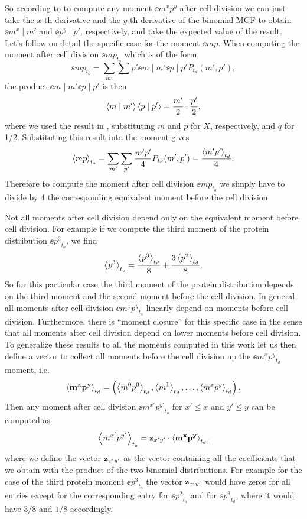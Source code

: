 So according to  to compute any moment $\ee{m^x
p^y}$ after cell division we can just take the $x$-th derivative and the $y$-th
derivative of the binomial MGF to obtain $\ee{m^x \mid m'}$ and $\ee{p^y \mid
p'}$, respectively, and take the expected value of the result. Let's follow on
detail the specific case for the moment $\ee{m p}$. When computing the moment
after cell division $\ee{mp}_{t_o}$ which is of
the form
\begin{equation}
\ee{mp}_{t_o} = \sum_{m'} \sum{p'} \ee{m \mid m'} \ee{p \mid p'} 
                P_{t_d}(m', p'),
\end{equation}
the product $\ee{m \mid m'} \ee{p \mid p'}$ is then
\begin{equation}
\left\langle m \mid m' \right\rangle \left\langle p \mid p' \right\rangle = {m' \over 2} \cdot {p' \over 2},
\end{equation}
where we used the result in , substituting $m$ and $p$ for
$X$, respectively, and $q$ for 1/2. Substituting this result into the moment
gives
\begin{equation}
\left\langle mp \right\rangle_{t_o} = \sum_{m'} \sum_{p'} {m' p' \over 4} P_{t_d}(m', p') 
              = {\left\langle m' p' \right\rangle_{t_d} \over 4}.
\end{equation}
Therefore to compute the moment after cell division $\ee{mp}_{t_o}$ we simply
have to divide by 4 the corresponding equivalent moment before the cell
division. 

Not all moments after cell division depend only on the equivalent moment before
cell division. For example if we compute the third moment of the protein
distribution $\ee{p^3}_{t_o}$, we find
\begin{equation}
  \left\langle p^3 \right\rangle_{t_o} = {\left\langle p^3 \right\rangle_{t_d} \over 8} + {3 \left\langle p^2 \right\rangle_{t_d} \over 8}.
\end{equation}
So for this particular case the third moment of the protein distribution
depends on the third moment and the second moment before the cell division. In
general all moments after cell division $\ee{m^x p^y}_{t_o}$ linearly depend on
moments before cell division. Furthermore, there is ``moment closure'' for this
specific case in the sense that all moments after cell division depend on lower
moments before cell division. To generalize these results to all the moments
computed in this work let us then define a vector to collect all moments before
the cell division up the $\ee{m^x p^y}_{t_d}$ moment, i.e.
\begin{equation}
\mathbf{\left\langle m^x p^y \right\rangle}_{t_d} = \left(
\left\langle m^0 p^0 \right\rangle_{t_d}, \left\langle m^1 \right\rangle_{t_d}, \ldots , \left\langle m^x p^y \right\rangle_{t_d}
\right).
\end{equation}
Then any moment after cell division $\ee{m^{x'} p^{y'}}_{t_o}$ for $x' \leq x$ and $y' \leq y$ can be computed as
$$
\left\langle m^{x'} p^{y'} \right\rangle_{t_o} = \mathbf{z}_{x'y'} \cdot \mathbf{\left\langle m^x p^y \right\rangle}_{t_d},
$$
where we define the vector $\mathbf{z}_{x'y'}$ as the vector containing all the
coefficients that we obtain with the product of the two binomial distributions.
For example for the case of the third protein moment $\ee{p^3}_{t_o}$ the
vector $\mathbf{z}_{x'y'}$ would have zeros for all entries except for the
corresponding entry for $\ee{p^2}_{t_d}$ and for $\ee{p^3}_{t_d}$, where it
would have $3/8$ and $1/8$ accordingly.

